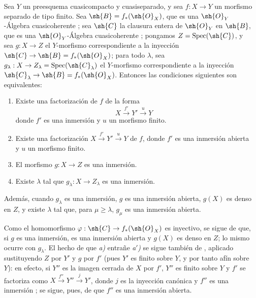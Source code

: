 \begin{proposition}[8.12.3]
\label{IV.8.12.3}
Sea $Y$ un preesquema cuasicompacto y cuasiseparado, y sea $f:X\to Y$ un morfismo separado de tipo finito.
Sea $\sh{B}=f_*(\sh{O}_X)$, que es una $\sh{O}_Y$-Álgebra cuasicoherente ; sea $\sh{C}$ la clausura entera de $\sh{O}_Y$ en $\sh{B}$, que es una $\sh{O}_Y$-Álgebra cuasicoherente ; pongamos $Z=\operatorname{Spec}(\sh{C})$, y sea $g:X\to Z$ el $Y$-morfismo correspondiente a la inyección $\sh{C}\to\sh{B}=f_*(\sh{O}_X)$; para todo $\lambda$, sea $g_\lambda:X\to Z_\lambda=\operatorname{Spec}(\sh{C}_\lambda)$ el $Y$-morfismo correspondiente a la inyección $\sh{C}_\lambda\to\sh{B}=f_*(\sh{O}_X)$.
Entonces las condiciones siguientes son equivalentes:
\begin{enumerate}[label=\emph{\alph*)}]
  \item[\emph{a)}] Existe una factorización de $f$ de la forma
\[
X\xrightarrow{f'}Y'\xrightarrow{u}Y
\]
donde $f'$ es una inmersión y $u$ un morfismo finito.
  \item[\emph{a$'$)}] Existe una factorización $X\xrightarrow{f'}Y'\xrightarrow{u}Y$ de $f$, donde $f'$ es una inmersión abierta y $u$ un morfismo finito.
  \item[\emph{b)}] El morfismo $g:X\to Z$ es una inmersión.
  \item[\emph{c)}] Existe $\lambda$ tal que $g_\lambda:X\to Z_\lambda$ es una inmersión.
\end{enumerate}
Además, cuando $g_\lambda$ es una inmersión, $g$ es una inmersión abierta, $g(X)$ es denso en $Z$, y existe $\lambda$ tal que, para $\mu\geqslant\lambda$, $g_\mu$ es una inmersión abierta.
\end{proposition}

Como el homomorfismo $\varphi:\sh{C}\to f_*(\sh{O}_X)$ es inyectivo, se sigue de  que, si $g$ es una inmersión, es una inmersión abierta y $g(X)$ es denso en $Z$; lo mismo ocurre con $g_\lambda$.
El hecho de que \emph{a)} entrañe \emph{a$'$)} se sigue también de , aplicado sustituyendo $Z$ por $Y'$ y $g$ por $f'$ (pues $Y'$ es finito sobre $Y$, y por tanto afín sobre $Y$): en efecto, si $Y''$ es la imagen cerrada de $X$ por $f'$, $Y''$ es finito sobre $Y$ y $f'$ se factoriza como $X\xrightarrow{f''}Y''\xrightarrow{j}Y'$, donde $j$ es la inyección canónica y $f''$ es una inmersión ; se sigue, pues, de  que $f''$ es una inmersión abierta.

